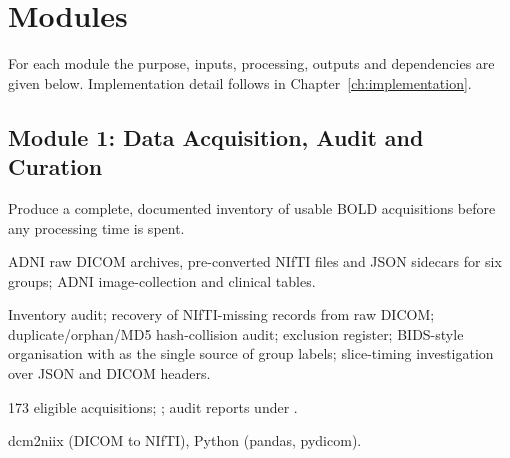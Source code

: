 \documentclass{ssnreview}
\begin{document}
\section{Modules}
For each module the purpose, inputs, processing, outputs and dependencies are
given below. Implementation detail follows in Chapter~\ref{ch:implementation}.

\subsection{Module 1: Data Acquisition, Audit and Curation}
\begin{modulebox}\begin{description}[leftmargin=2.6cm, style=nextline, font=\normalfont\bfseries\color{SSNBlue}]
  \item[Purpose] Produce a complete, documented inventory of usable BOLD
        acquisitions before any processing time is spent.
  \item[Inputs] ADNI raw DICOM archives, pre-converted NIfTI files and JSON
        sidecars for six groups; ADNI image-collection and clinical tables.
  \item[Processing] Inventory audit; recovery of NIfTI-missing records from
        raw DICOM; duplicate/orphan/MD5 hash-collision audit; exclusion
        register; BIDS-style organisation with
         as the single source of group labels;
        slice-timing investigation over JSON and DICOM headers.
  \item[Outputs] 173 eligible acquisitions; ;
        audit reports under .
  \item[Dependencies] dcm2niix (DICOM to NIfTI), Python (pandas, pydicom).
\end{description}\end{modulebox}
\end{document}
